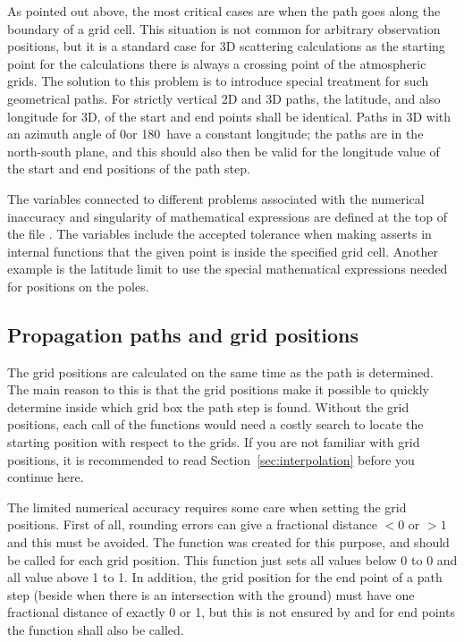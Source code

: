 As pointed out above, the most critical cases are when the path goes
along the boundary of a grid cell. This situation is not common for
arbitrary observation positions, but it is a standard case for 3D
scattering calculations as the starting point for the calculations
there is always a crossing point of the atmospheric grids. The
solution to this problem is to introduce special treatment for such
geometrical paths. For strictly vertical 2D and 3D paths, the
latitude, and also longitude for 3D, of the start and end points shall
be identical. Paths in 3D with an azimuth angle of 0\degree or
180\degree\ have a constant longitude; the paths are in the north-south
plane, and this should also then be valid for the longitude value of
the start and end positions of the path step.

The variables connected to different problems associated with the
numerical inaccuracy and singularity of mathematical expressions are
defined at the top of the file . The variables
include the accepted tolerance when making asserts in internal
functions that the given point is inside the specified grid cell.
Another example is the latitude limit to use the special mathematical
expressions needed for positions on the poles.



\subsection{Propagation paths and grid positions}

The grid positions are calculated on the same time as the path is
determined. The main reason to this is that the grid positions make it
possible to quickly determine inside which grid box the path step is
found. Without the grid positions, each call of the functions would
need a costly search to locate the starting position with respect to
the grids. If you are not familiar with grid positions, it is
recommended to read Section~\ref{sec:interpolation} before you
continue here.

The limited numerical accuracy requires some care when setting the
grid positions. First of all, rounding errors can give a fractional
distance $< 0$ or $> 1$ and this must be avoided. The function
 was created for this purpose, and
should be called for each grid position. This function just
sets all values below 0 to 0 and all value above 1 to 1. In addition,
the grid position for the end point of a path step (beside when there
is an intersection with the ground) must have one fractional
distance of exactly 0 or 1, but this is not ensured by
 and for end points the function
 shall also be called.

